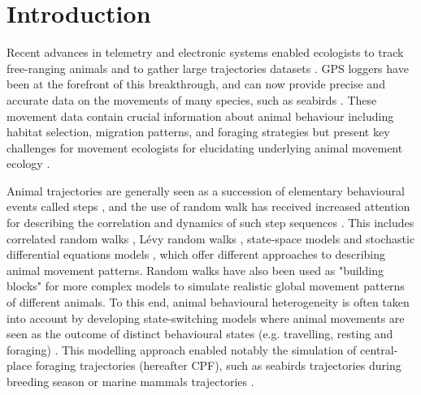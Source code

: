 \documentclass{article}
\begin{document}

\section{Introduction}

Recent advances in telemetry and electronic systems enabled ecologists to track free-ranging animals and to gather large trajectories datasets \citep{ropert-coudert_diving_2009,bograd_biologging_2010,chung_review_2021}. GPS loggers have been at the forefront of this breakthrough, and can now provide precise and accurate data on the movements of many species, such as seabirds \citep{wakefield_quantifying_2009,yoda_advances_2019}. These movement data contain crucial information about animal behaviour including habitat selection, migration patterns, and foraging strategies but present key challenges for movement ecologists for elucidating underlying animal movement ecology \citep{hays_key_2016}. 

Animal trajectories are generally seen as a succession of elementary behavioural events called steps \citep{nathan_movement_2008}, and the use of random walk has received increased attention for describing the correlation and dynamics of such step sequences \citep{turchin_quantitative_1998,codling_random_2008}. This includes correlated random walks \citep[e.g.][]{bergman_caribou_2000}, Lévy random walks \citep[e.g.][]{viswanathan_levy_2008}, state-space models \citep[e.g.][]{patterson_statespace_2008} and stochastic differential equations models \citep[e.g.][]{michelot_langevin_2018}, which offer different approaches to describing animal movement patterns. Random walks have also been used as "building blocks" for more complex models to simulate realistic global movement patterns of different animals. To this end, animal behavioural heterogeneity is often taken into account by developing state-switching models where animal movements are seen as the outcome of distinct behavioural states (e.g. travelling, resting and foraging) \citep{morales_extracting_2004}. This modelling approach enabled notably the simulation of central-place foraging trajectories (hereafter CPF), such as seabirds trajectories during breeding season \citep[e.g.][]{boyd_effects_2016,zhang_linking_2017} or marine mammals trajectories \citep[e.g.][]{satterthwaite_behavioral_2012,massardier-galata_breeding_2017}.
\end{document}

